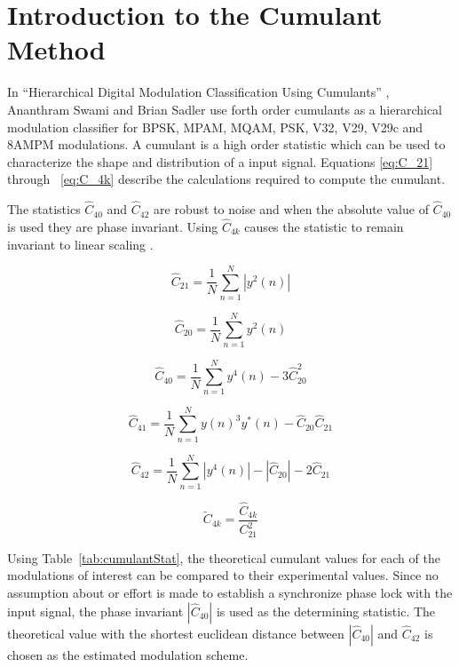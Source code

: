 \section{Introduction to the Cumulant Method}

In ``Hierarchical Digital Modulation Classification Using Cumulants''
\cite{swami2000}, Ananthram Swami and Brian Sadler use forth order cumulants as
a hierarchical modulation classifier for BPSK, MPAM, MQAM, PSK, V32, V29, V29c
and 8AMPM modulations. A cumulant is a high order statistic which can be used to
characterize the shape and distribution of a input signal\cite{swami2000}.
Equations \ref{eq:C_21} through ~\ref{eq:C_4k} describe the calculations
required to compute the cumulant.  

The statistics $\hat{C}_{40}$ and $\hat{C}_{42}$ are robust to noise and when
the absolute value of $\hat{C}_{40}$ is used they are phase invariant.  Using
$\hat{C}_{4k}$ causes the statistic to remain invariant to linear scaling
\cite{swami2000}.

\begin{equation}
\hat{C}_{21} = \frac{1}{N} \sum_{n=1}^{N} |y^2(n)|
\label{eq:C_21}
\end{equation}

\begin{equation}
\hat{C}_{20} = \frac{1}{N} \sum_{n=1}^{N} y^2(n)
\label{eq:C_20} 
\end{equation}

\begin{equation}
\hat{C}_{40} = \frac{1}{N} \sum_{n=1}^{N} y^4(n) - 3 \hat{C}_{20}^2
\label{eq:C_40} 
\end{equation}

\begin{equation}
\hat{C}_{41} = \frac{1}{N} \sum_{n=1}^{N} y(n)^3 y^*(n) - \hat{C}_{20}\hat{C}_21
\label{eq:C_41}
\end{equation}

\begin{equation}
\hat{C}_{42} = \frac{1}{N} \sum_{n=1}^{N} |y^4(n)|-|\hat{C}_{20}|-2\hat{C}_{21}
\label{eq:C_42} 
\end{equation}

\begin{equation}
\tilde{C}_{4k} = \frac{\hat{C}_{4k}}{C_{21}^2}
\label{eq:C_4k}  
\end{equation}

Using Table~\ref{tab:cumulantStat}, the theoretical cumulant values for each of
the modulations of interest can be compared to their experimental values.  Since
no assumption about or effort is made to establish a synchronize phase lock with
the input signal, the phase invariant $|\hat{C}_{40}|$ is used as the determining
statistic.  The theoretical value with the shortest euclidean distance between 
$|\hat{C}_{40}|$ and  $\hat{C}_{42}$ is chosen as the estimated modulation
scheme.


